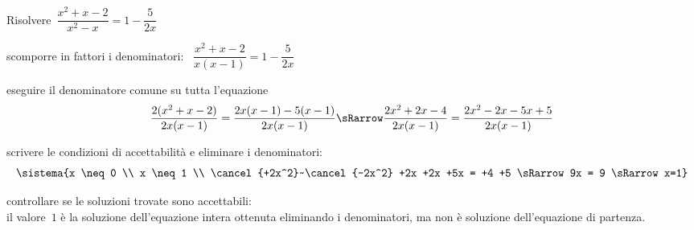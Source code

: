 \begin{esempio}
Risolvere~\(\dfrac{x^{2}+x-2}{x^{2}-x}=1-\dfrac{5}{2x}\)

\begin{enumerate*}
\item scomporre in fattori i denominatori:~
\(\dfrac{x^{2}+x-2}{x(x-1)}=1-\dfrac{5}{2x}\)

\item eseguire il denominatore comune su tutta l'equazione
\[\frac{2(x^{2}+x-2)}{2x(x-1)}=\frac{2x(x-1)-5(x-1)}{2x(x-1)} \sRarrow
\frac{2x^{2}+2x-4}{2x(x-1)}=\frac{2x^2-2x-5x+5}{2x(x-1)}\]

\item scrivere le condizioni di accettabilità e eliminare i denominatori:
\[\sistema{x \neq 0 \\ 
           x \neq 1 \\ 
           \cancel{+2x^2}~\cancel{-2x^2} +2x +2x +5x = +4 +5 \sRarrow
             9x = 9 \sRarrow x=1}\]


\item controllare se le soluzioni trovate sono accettabili:\\
il valore~\(1\) è la soluzione dell'equazione intera ottenuta eliminando i 
denominatori, ma non è soluzione dell'equazione di partenza.
\end{enumerate*}
 \end{esempio}
 

